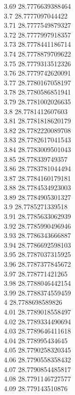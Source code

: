 {3.69	28.7776639388464\\
3.7	28.7777097044422\\
3.71	28.7777549879327\\
3.72	28.7777997918357\\
3.73	28.7778441186714\\
3.74	28.7778879709622\\
3.75	28.7779313512326\\
3.76	28.7779742620091\\
3.77	28.7780167058197\\
3.78	28.7780586851941\\
3.79	28.7781002026635\\
3.8	28.7781412607603\\
3.81	28.7781818620179\\
3.82	28.7782220089708\\
3.83	28.7782617041543\\
3.84	28.7783009501043\\
3.85	28.778339749357\\
3.86	28.7783781044494\\
3.87	28.7784160179181\\
3.88	28.7784534923003\\
3.89	28.7784905301327\\
3.9	28.7785271339518\\
3.91	28.7785633062939\\
3.92	28.7785990496946\\
3.93	28.7786343666887\\
3.94	28.7786692598103\\
3.95	28.7787037315925\\
3.96	28.7787377845672\\
3.97	28.778771421265\\
3.98	28.7788046442154\\
3.99	28.7788374559459\\
4	28.7788698589826\\
4.01	28.7789018558497\\
4.02	28.7789334490694\\
4.03	28.7789646411618\\
4.04	28.778995434645\\
4.05	28.7790258320345\\
4.06	28.7790558358432\\
4.07	28.7790854485817\\
4.08	28.7791146727577\\
4.09	28.779143510876\\
}
